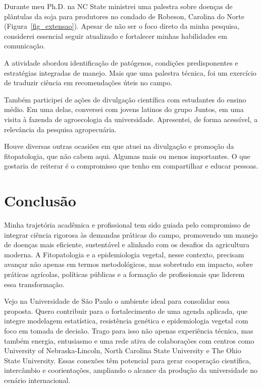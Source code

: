 \documentclass[12pt,a4paper,oneside]{book}
\newcommand{\USP}{Universidade de São Paulo}
\newcommand{\UNL}{University of Nebraska-Lincoln}
\newcommand{\NCState}{North Carolina State University}
\newcommand{\OSU}{The Ohio State University}
\begin{document}
Durante meu Ph.D. na NC State ministrei uma palestra sobre doenças de plântulas da soja para produtores no condado de Robeson, 
Carolina do Norte (Figura~\ref{fig_extensao}). Apesar de não ser o foco direto da minha pesquisa, considerei essencial 
seguir atualizado e fortalecer minhas habilidades em comunicação.

A atividade abordou identificação de patógenos, condições predisponentes e estratégias integradas de manejo. 
Mais que uma palestra técnica, foi um exercício de traduzir ciência em recomendações úteis no campo.

Também participei de ações de divulgação científica com estudantes do ensino médio. Em uma delas, conversei 
com jovens latinos do grupo Juntos, em uma visita à fazenda de agroecologia da universidade. Apresentei, de 
forma acessível, a relevância da pesquisa agropecuária.

Houve diversas outras ocasiões em que atuei na divulgação e promoção da fitopatologia, que não cabem aqui. Algumas mais ou menos importantes.
O que gostaria de reiterar é o compromisso que tenho em compartilhar e educar pessoas.

  


\chapter{Conclusão}
\label{cap_conclusao}

Minha trajetória acadêmica e profissional tem sido guiada pelo compromisso de integrar ciência rigorosa às demandas 
práticas do campo, promovendo um manejo de doenças mais eficiente, sustentável e alinhado com os desafios da 
agricultura moderna. A Fitopatologia e a epidemiologia vegetal, nesse contexto, precisam avançar não apenas 
em termos metodológicos, mas sobretudo em impacto, sobre práticas agrícolas, políticas públicas 
e a formação de profissionais que liderem essa transformação.

Vejo na \USP{} o ambiente ideal para consolidar essa proposta. Quero contribuir para o fortalecimento de 
uma agenda aplicada, que integre modelagem estatística, resistência genética e epidemiologia vegetal 
com foco em tomada de decisão. Trago para isso não apenas experiência técnica, mas também energia, 
entusiasmo e uma rede ativa de colaborações com centros como \UNL{}, \NCState{} e \OSU{}. Essas conexões 
têm potencial para gerar cooperação científica, intercâmbio e coorientações, ampliando o alcance da
produção da universidade no cenário internacional.
\end{document}
